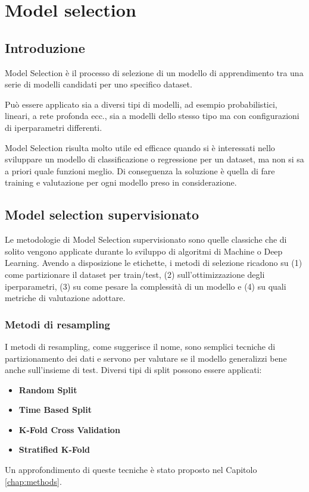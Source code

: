 \chapter{Model selection}
\label{chap:modelselection}

\section{Introduzione}
Model Selection è il processo di selezione di un modello di apprendimento tra una serie di modelli candidati per uno specifico dataset.

Può essere applicato sia a diversi tipi di modelli, ad esempio probabilistici, lineari, a rete profonda ecc., sia a modelli dello stesso tipo ma con configurazioni di iperparametri differenti.

Model Selection risulta molto utile ed efficace quando si è interessati nello sviluppare un modello di classificazione o regressione per un dataset, ma non si sa a priori quale funzioni meglio. Di conseguenza la soluzione è quella di fare training e valutazione per ogni modello preso in considerazione.

\section{Model selection supervisionato}
Le metodologie di Model Selection supervisionato sono quelle classiche che di solito vengono applicate durante lo sviluppo di algoritmi di Machine o Deep Learning. Avendo a disposizione le etichette, i metodi di selezione ricadono su (1) come partizionare il dataset per train/test, (2) sull'ottimizzazione degli iperparametri, (3) su come pesare la complessità di un modello e (4) su quali metriche di valutazione adottare.

\subsection{Metodi di resampling}
I metodi di resampling, come suggerisce il nome, sono semplici tecniche di partizionamento dei dati e servono per valutare se il modello generalizzi bene anche sull'insieme di test. Diversi tipi di split possono essere applicati:
\begin{itemize}
	\item \textbf{Random Split}
	\item \textbf{Time Based Split} 
	\item \textbf{K-Fold Cross Validation}
	\item \textbf{Stratified K-Fold}
\end{itemize}
Un approfondimento di queste tecniche è stato proposto nel Capitolo \ref{chap:methods}.

